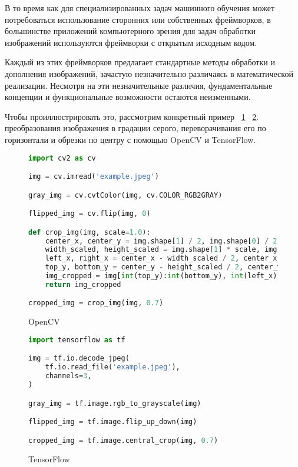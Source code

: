 В то время как для специализированных задач машинного обучения может потребоваться использование сторонних или собственных фреймворков, в большинстве приложений компьютерного зрения для задач обработки изображений используются фреймворки с открытым исходным кодом.

Каждый из этих фреймворков предлагает стандартные методы обработки и дополнения изображений, зачастую незначительно различаясь в математической реализации. Несмотря на эти незначительные различия, фундаментальные концепции и функциональные возможности остаются неизменными.

Чтобы проиллюстрировать это, рассмотрим конкретный пример ~\ref{src:src1} ~\ref{src:src2}. преобразования изображения в градации серого, переворачивания его по горизонтали и обрезки по центру с помощью OpenCV и TensorFlow.

\begin{figure}
\begin{lstlisting}[language=Python]
import cv2 as cv

img = cv.imread('example.jpeg')

gray_img = cv.cvtColor(img, cv.COLOR_RGB2GRAY)

flipped_img = cv.flip(img, 0)

def crop_img(img, scale=1.0):
    center_x, center_y = img.shape[1] / 2, img.shape[0] / 2
    width_scaled, height_scaled = img.shape[1] * scale, img.shape[0] * scale
    left_x, right_x = center_x - width_scaled / 2, center_x + width_scaled / 2
    top_y, bottom_y = center_y - height_scaled / 2, center_y + height_scaled / 2
    img_cropped = img[int(top_y):int(bottom_y), int(left_x):int(right_x)]
    return img_cropped

cropped_img = crop_img(img, 0.7)
\end{lstlisting}
\caption{OpenCV}
\label{src:src1}
\end{figure} 


\begin{figure}
\begin{lstlisting}[language=Python]
import tensorflow as tf

img = tf.io.decode_jpeg(
    tf.io.read_file('example.jpeg'),
    channels=3,
)

gray_img = tf.image.rgb_to_grayscale(img)

flipped_img = tf.image.flip_up_down(img)

cropped_img = tf.image.central_crop(img, 0.7)
\end{lstlisting}
\caption{TensorFlow}
\label{src:src2}
\end{figure}

